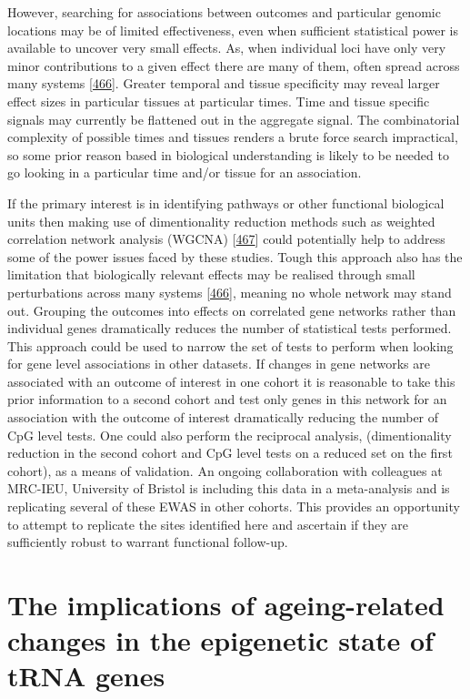 \documentclass[
]{book}
\begin{document}
However, searching for associations between outcomes and particular genomic locations may be of limited effectiveness, even when sufficient statistical power is available to uncover very small effects.
As, when individual loci have only very minor contributions to a given effect there are many of them, often spread across many systems {[}\protect\hyperlink{ref-Boyle2017}{466}{]}.
Greater temporal and tissue specificity may reveal larger effect sizes in particular tissues at particular times.
Time and tissue specific signals may currently be flattened out in the aggregate signal.
The combinatorial complexity of possible times and tissues renders a brute force search impractical, so some prior reason based in biological understanding is likely to be needed to go looking in a particular time and/or tissue for an association.

If the primary interest is in identifying pathways or other functional biological units then making use of dimentionality reduction methods such as weighted correlation network analysis (WGCNA) {[}\protect\hyperlink{ref-Langfelder2008}{467}{]} could potentially help to address some of the power issues faced by these studies.
Tough this approach also has the limitation that biologically relevant effects may be realised through small perturbations across many systems {[}\protect\hyperlink{ref-Boyle2017}{466}{]}, meaning no whole network may stand out.
Grouping the outcomes into effects on correlated gene networks rather than individual genes dramatically reduces the number of statistical tests performed.
This approach could be used to narrow the set of tests to perform when looking for gene level associations in other datasets.
If changes in gene networks are associated with an outcome of interest in one cohort it is reasonable to take this prior information to a second cohort and test only genes in this network for an association with the outcome of interest dramatically reducing the number of CpG level tests.
One could also perform the reciprocal analysis, (dimentionality reduction in the second cohort and CpG level tests on a reduced set on the first cohort), as a means of validation.
An ongoing collaboration with colleagues at MRC-IEU, University of Bristol is including this data in a meta-analysis and is replicating several of these EWAS in other cohorts.
This provides an opportunity to attempt to replicate the sites identified here and ascertain if they are sufficiently robust to warrant functional follow-up.

\hypertarget{the-implications-of-ageing-related-changes-in-the-epigenetic-state-of-trna-genes}{%
\section{The implications of ageing-related changes in the epigenetic state of tRNA genes}\label{the-implications-of-ageing-related-changes-in-the-epigenetic-state-of-trna-genes}}
\end{document}
